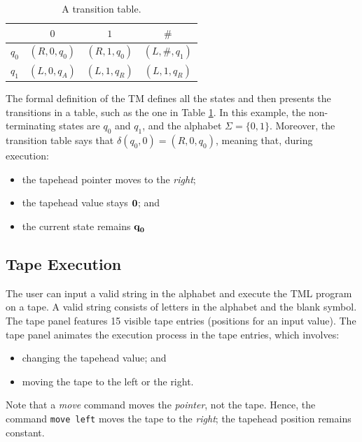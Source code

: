 \begin{table}[htb]
    \centering
    \begin{tabular}{c|ccc}
        & $0$ & $1$ & $\#$ \\
        \hline
        $q_0$ & $(R, 0, q_0)$ & $(R, 1, q_0)$ & $(L, \#, q_1)$ \\
        $q_1$ & $(L, 0, q_A)$ & $(L, 1, q_R)$ & $(L, 1, q_R)$ 
    \end{tabular}
    \caption{A transition table.}
    \label{tbl:table_isDiv2}
\end{table}

The formal definition of the TM defines all the states and then presents the transitions in a table, such as the one in Table \ref{tbl:table_isDiv2}. In this example, the non-terminating states are $q_0$ and $q_1$, and the alphabet $\Sigma = \{0, 1\}$. Moreover, the transition table says that $\delta(q_0, 0) = (R, 0, q_0)$, meaning that, during execution:
\begin{itemize}
    \item the tapehead pointer moves to the \emph{right};
    \item the tapehead value stays $\emph{0}$; and 
    \item the current state remains $\emph{q}_\emph{0}$
\end{itemize}

\subsection{Tape Execution}
The user can input a valid string in the alphabet and execute the TML program on a tape. A valid string consists of letters in the alphabet and the blank symbol. The tape panel features 15 visible tape entries (positions for an input value). The tape panel animates the execution process in the tape entries, which involves:
\begin{itemize}
    \item changing the tapehead value; and
    \item moving the tape to the left or the right.
\end{itemize}
Note that a \textit{move} command moves the \textit{pointer}, not the tape. Hence, the command \texttt{move left} moves the tape to the \textit{right}; the tapehead position remains constant.

